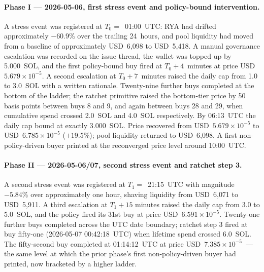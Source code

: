 \documentclass[11pt,a4paper]{article}
\begin{document}
\paragraph{Phase I --- 2026-05-06, first stress event and policy-bound
intervention.} A stress event was registered at $T_0 = $~01:00~UTC: RYA
had drifted approximately $-60.9\%$ over the trailing 24~hours, and
pool liquidity had moved from a baseline of approximately USD~6{,}098
to USD~5{,}418. A manual governance escalation was recorded on the
issue thread, the wallet was topped up by 5.000~SOL, and the first
policy-bound buy fired at $T_0 + 4$~minutes at price
USD~$5.679\!\times\!10^{-5}$. A second escalation at $T_0 + 7$~minutes
raised the daily cap from 1.0 to 3.0~SOL with a written rationale.
Twenty-nine further buys completed at the bottom of the ladder; the
ratchet primitive raised the bottom-tier price by 50 basis points
between buys 8 and 9, and again between buys 28 and 29, when cumulative
spend crossed 2.0~SOL and 4.0~SOL respectively. By 06:13~UTC the daily
cap bound at exactly 3.000~SOL. Price recovered from
USD~$5.679\!\times\!10^{-5}$ to USD~$6.785\!\times\!10^{-5}$
($+19.5\%$); pool liquidity returned to USD~6{,}098. A first
non-policy-driven buyer printed at the reconverged price level around
10:00~UTC.

\paragraph{Phase II --- 2026-05-06/07, second stress event and ratchet
step 3.} A second stress event was registered at $T_1 = $~21:15~UTC
with magnitude $-5.84\%$ over approximately one hour, shaving liquidity
from USD~6{,}071 to USD~5{,}911. A third escalation at $T_1 + 15$
minutes raised the daily cap from 3.0 to 5.0~SOL, and the policy fired
its 31st buy at price USD~$6.591\!\times\!10^{-5}$. Twenty-one further
buys completed across the UTC date boundary; ratchet step 3 fired at
buy fifty-one (2026-05-07 00:42:18~UTC) when lifetime spend crossed
6.0~SOL. The fifty-second buy completed at 01:14:12~UTC at price
USD~$7.385\!\times\!10^{-5}$~--- the same level at which the prior
phase's first non-policy-driven buyer had printed, now bracketed by a
higher ladder.
\end{document}
